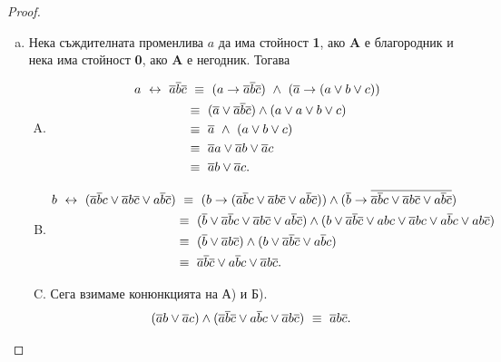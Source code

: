 \begin{proof}
  \begin{enumerate}[a)]
  \item
    Нека съждителната променлива $a$ да има стойност {\bf 1}, ако {\bf A} е благородник и нека има стойност {\bf 0}, 
    ако {\bf A} е негодник.
    Тогава
    \begin{enumerate}[A)]
    \item
      \begin{align*}
        a \ \leftrightarrow\  \overline{a}\overline{b}\overline{c} &\ \equiv\ (a \rightarrow \overline{a}\overline{b}\overline{c})\ \wedge\ (\overline{a}\rightarrow (a\vee b \vee c))\\
        & \equiv\ (\overline{a} \vee \overline{a}\overline{b}\overline{c}) \wedge (a \vee a\vee b \vee c)\\
        & \equiv\ \overline{a}\ \wedge\ (a \vee b \vee c)\\
        & \equiv\ \overline{a}a \vee \overline{a}b \vee \overline{a}c\\
        & \equiv\ \overline{a}b \vee \overline{a}c.
      \end{align*}
    \item
      \begin{align*}
        b \ \leftrightarrow\  (\overline{a}\overline{b}c\vee \overline{a}b\overline{c}\vee a\overline{b}\overline{c}) &\ \equiv\ (b \rightarrow (\overline{a}\overline{b}c\vee \overline{a}b\overline{c}\vee a\overline{b}\overline{c}))\wedge (\overline{b}\rightarrow \overline{\overline{a}\overline{b}c\vee \overline{a}b\overline{c}\vee a\overline{b}\overline{c}})\\
        & \equiv\ (\overline{b} \vee \overline{a}\overline{b}c\vee \overline{a}b\overline{c}\vee a\overline{b}\overline{c}) \wedge (b\vee \overline{a}\overline{b}\overline{c}\vee abc \vee \overline{a}bc \vee a\overline{b}c \vee ab\overline{c})\\
        & \equiv\ (\overline{b} \vee \overline{a}b\overline{c}) \wedge (b \vee \overline{a}\overline{b}\overline{c} \vee  a\overline{b}c)\\
        & \equiv\  \overline{a}\overline{b}\overline{c} \vee  a\overline{b}c \vee \overline{a}b\overline{c}.
      \end{align*}
    \item
      Сега взимаме конюнкцията на А) и Б).
      \begin{align*}
        (\overline{a}b \vee \overline{a}c)\wedge (\overline{a}\overline{b}\overline{c} \vee  a\overline{b}c \vee \overline{a}b\overline{c}) &\ \equiv\ \overline{a}b\overline{c}.
      \end{align*}
    \end{enumerate}
  \end{enumerate}
\end{proof}

